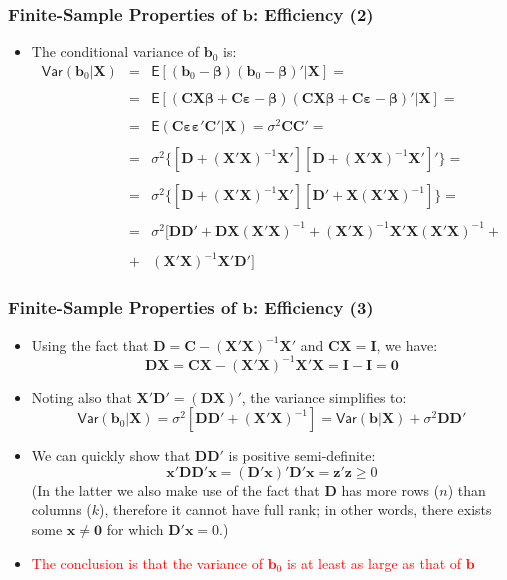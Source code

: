 \documentclass[10pt]{beamer}
\newcommand{\var}{\mathsf{Var}}
\theoremstyle{definition}
\begin{document}
\begin{frame}[fragile]
\frametitle{Finite-Sample Properties of $\mathbf{b}$: Efficiency (2)}
\begin{itemize}
	\item The conditional variance of $\mathbf{b}_{0}$ is:
	\[
		\begin{array}{lcl}
			\var(\mathbf{b}_{0}|\mathbf{X}) & = & \mathsf{E}[(\mathbf{b}_{0} - \boldsymbol\beta)(\mathbf{b}_{0} - \boldsymbol\beta)'|\mathbf{X}] = \\
			\quad\\
			& = & \mathsf{E}[(\mathbf{CX}\bm\beta + \mathbf{C}\bm\varepsilon -\bm\beta)(\mathbf{CX}\bm\beta + \mathbf{C}\bm\varepsilon -\bm\beta)'|\mathbf{X}] = \\
			\quad\\
			& = & \mathsf{E}(\mathbf{C}\bm\varepsilon\bm\varepsilon'\mathbf{C}'|\mathbf{X}) = \sigma^{2}\mathbf{CC'} = \\
			\quad\\
			& = & \sigma^{2}\{[\mathbf{D + (X'X)}^{-1}\mathbf{X}'][\mathbf{D + (X'X)}^{-1}\mathbf{X}']'\} = \\
			\quad\\
			& = & \sigma^{2}\{[\mathbf{D + (X'X)}^{-1}\mathbf{X}'][\mathbf{D' + X(X'X)}^{-1}]\} =\\
			\quad\\
			& = & \sigma^{2}[\mathbf{DD' + DX(X'X)}^{-1} + \mathbf{(X'X)}^{-1}\mathbf{X'X(X'X)}^{-1} + \\
			\quad\\
			& + & \mathbf{(X'X)}^{-1}\mathbf{X}'\mathbf{D}']
		\end{array}
	\]
\end{itemize}
\end{frame}

\begin{frame}[fragile]
\frametitle{Finite-Sample Properties of $\mathbf{b}$: Efficiency (3)}
\begin{itemize}
	\item Using the fact that $\mathbf{D = C - (X'X)}^{-1}\mathbf{X}'$ and $\mathbf{CX = I}$, we have:
	\[
		\mathbf{DX = CX - (X'X)}^{-1}\mathbf{X'X} = \mathbf{I - I = 0} 
	\]
	\item Noting also that $\mathbf{X}'\mathbf{D}' = (\mathbf{DX})'$, the variance simplifies to:
	\[
		\var(\mathbf{b}_{0}|\mathbf{X}) = \sigma^{2}[\mathbf{DD'} + \mathbf{(X'X)}^{-1}] = \var(\mathbf{b}|\mathbf{X}) + \sigma^{2}\mathbf{DD'}
	\]
	\item We can quickly show that $\mathbf{DD'}$ is positive semi-definite:
	\[
		\mathbf{x'DD'x = (D'x)'D'x = z'z} \geq 0
	\]
	(In the latter we also make use of the fact that $\mathbf{D}$ has more rows ($n$) than columns ($k$), therefore it cannot have full rank; in other words, there exists some $\mathbf{x} \neq \mathbf{0}$ for which $\mathbf{D'x} = 0$.)
	\item \textcolor{red}{The conclusion is that the variance of $\mathbf{b}_{0}$ is at least as large as that of $\mathbf{b}$}
\end{itemize}
\end{frame}
\end{document}
